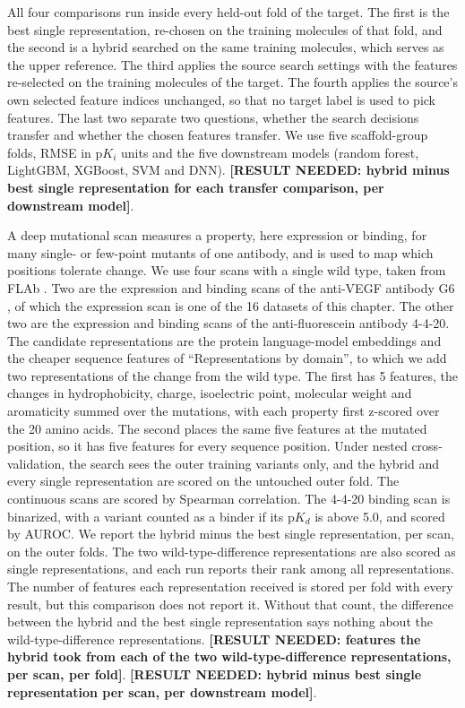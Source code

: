 All four comparisons run inside every held-out fold of the target. The first is the best single representation, re-chosen on the training molecules of that fold, and the second is a hybrid searched on the same training molecules, which serves as the upper reference. The third applies the source search settings with the features re-selected on the training molecules of the target. The fourth applies the source's own selected feature indices unchanged, so that no target label is used to pick features. The last two separate two questions, whether the search decisions transfer and whether the chosen features transfer. We use five scaffold-group folds, RMSE in $\mathrm{p}K_i$ units and the five downstream models (random forest, LightGBM, XGBoost, SVM and DNN). \textbf{[RESULT NEEDED: hybrid minus best single representation for each transfer comparison, per downstream model]}.

A deep mutational scan measures a property, here expression or binding, for many single- or few-point mutants of one antibody, and is used to map which positions tolerate change. We use four scans with a single wild type, taken from FLAb \citep{Chungyoun2024}. Two are the expression and binding scans of the anti-VEGF antibody G6 \citep{Koenig2017}, of which the expression scan is one of the 16 datasets of this chapter. The other two are the expression and binding scans of the anti-fluorescein antibody 4-4-20. The candidate representations are the protein language-model embeddings and the cheaper sequence features of ``Representations by domain'', to which we add two representations of the change from the wild type. The first has 5 features, the changes in hydrophobicity, charge, isoelectric point, molecular weight and aromaticity summed over the mutations, with each property first z-scored over the 20 amino acids. The second places the same five features at the mutated position, so it has five features for every sequence position. Under nested cross-validation, the search sees the outer training variants only, and the hybrid and every single representation are scored on the untouched outer fold. The continuous scans are scored by Spearman correlation. The 4-4-20 binding scan is binarized, with a variant counted as a binder if its $\mathrm{p}K_d$ is above 5.0, and scored by AUROC. We report the hybrid minus the best single representation, per scan, on the outer folds. The two wild-type-difference representations are also scored as single representations, and each run reports their rank among all representations. The number of features each representation received is stored per fold with every result, but this comparison does not report it. Without that count, the difference between the hybrid and the best single representation says nothing about the wild-type-difference representations. \textbf{[RESULT NEEDED: features the hybrid took from each of the two wild-type-difference representations, per scan, per fold]}. \textbf{[RESULT NEEDED: hybrid minus best single representation per scan, per downstream model]}.

